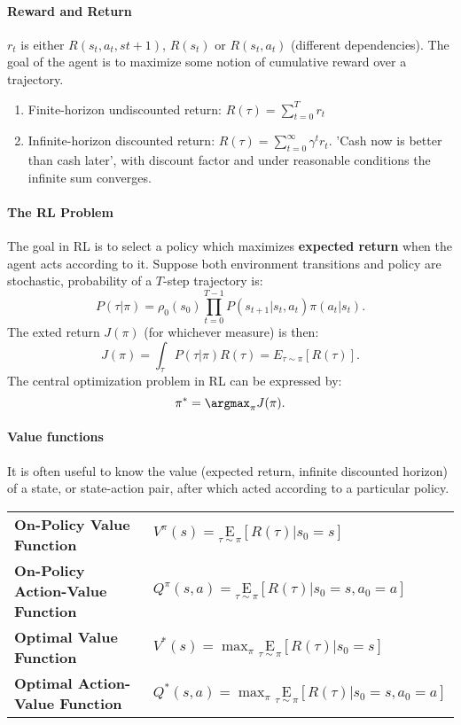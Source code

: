 \paragraph{Reward and Return} $r_t$ is either $R(s_t, a_t, s{t+1})$, $R(s_t)$ or $R(s_t, a_t)$ (different dependencies). The goal of the agent is to maximize some notion of cumulative reward over a trajectory.
\begin{enumerate}
    \item
        Finite-horizon undiscounted return: $R(\tau) = \sum_{t=0}^T r_t$
    \item
        Infinite-horizon discounted return: $R(\tau) = \sum_{t=0}^{\infty} \gamma^t r_t$. 'Cash now is better than cash later', with discount factor and under reasonable conditions the infinite sum converges.
\end{enumerate}

\paragraph{The RL Problem} The goal in RL is to select a policy which maximizes \textbf{expected return} when the agent acts according to it. Suppose both environment transitions and policy are stochastic, probability of a $T$-step trajectory is: 
$$P(\tau | \pi) = \rho_0(s_0) \prod_{t=0}^{T-1} P(s_{t+1} | s_t, a_t) \pi(a_t | s_t).$$
The exted return $J(\pi)$ (for whichever measure) is then: 
$$J(\pi) = \int_{\tau} P(\tau | \pi) R(\tau) = E_{\tau \sim \pi}[R(\tau)].$$
The central optimization problem in RL can be expressed by:
$$\pi^* = \argmax_{\pi} J(\pi).$$

\paragraph{Value functions} It is often useful to know the value (expected return, infinite discounted horizon) of a state, or state-action pair, after which acted according to a particular policy. 

\begin{tabular}{ll}
    \textbf{On-Policy Value Function} & \( V^{\pi}(s)=\underset{\tau \sim \pi}{\mathrm{E}}\left[R(\tau) | s_{0}=s\right] \) \\
    \textbf{On-Policy Action-Value Function} & \( Q^{\pi}(s, a)=\underset{\tau \sim \pi}{\mathrm{E}}\left[R(\tau) | s_{0}=s, a_{0}=a\right] \) \\
    \textbf{Optimal Value Function} & \( V^{*}(s)=\max _{\pi} \underset{\tau \sim \pi}{\mathrm{E}}\left[R(\tau) | s_{0}=s\right] \) \\
    \textbf{Optimal Action-Value Function} & \( Q^{*}(s, a)=\max _{\pi} \underset{\tau \sim \pi}{\mathrm{E}}\left[R(\tau) | s_{0}=s, a_{0}=a\right] \)
\end{tabular}

